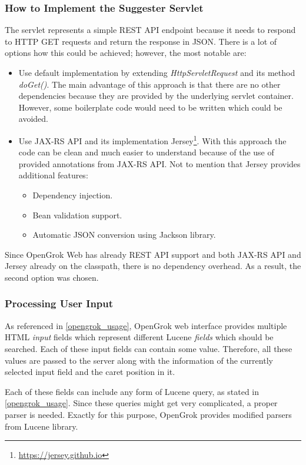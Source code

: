 \subsubsection{How to Implement the Suggester Servlet}
The servlet represents a simple REST API endpoint
because it needs to respond to HTTP GET requests and return the response in JSON.
There is a lot of options how this could be achieved; however, the most notable are:
\begin{itemize}
    \item Use default implementation by extending \textit{HttpServletRequest} and its method \textit{doGet()}. The main
    advantage of this approach is that there are no other dependencies because they are provided by the underlying servlet container.
     However, some boilerplate code would need
    to be written which could be avoided.
    \item Use JAX-RS API and its implementation Jersey\footnote{\url{https://jersey.github.io}}. With this approach the
    code can be clean and much easier to understand because of the use of provided annotations from JAX-RS API.
    Not to mention that Jersey provides additional features:
    \begin{itemize}
        \item Dependency injection.
        \item Bean validation support.
        \item Automatic JSON conversion using Jackson library.
    \end{itemize}
\end{itemize}

Since OpenGrok Web has already REST API support and both JAX-RS API and Jersey already on the classpath,
there is no dependency overhead. As a result, the second option was chosen.

\subsubsection{Processing User Input}
\label{processing_user_input}
As referenced in \ref{opengrok_usage}, OpenGrok web interface provides multiple HTML \textit{input} fields which
represent different Lucene \textit{fields} which should be searched. Each of these input fields can contain some value.
Therefore, all these values are passed to the server along with the information of the currently selected input field and
the caret position in it.

Each of these fields can include any form of Lucene query, as stated in \ref{opengrok_usage}. Since these queries might
get very complicated, a proper parser is needed. Exactly for this purpose, OpenGrok provides modified parsers from Lucene library.


